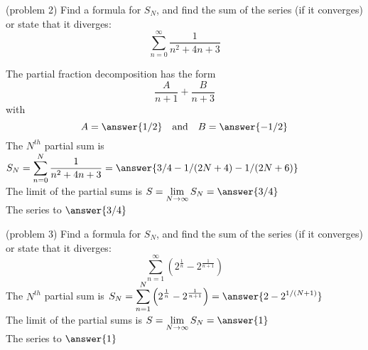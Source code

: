 \documentclass[handout]{ximera}
\begin{document}
\begin{problem}(problem 2)
Find a formula for $S_N$, and find the sum of the series (if it converges) or state that it diverges:
\[
\sum_{n=0}^\infty \frac{1}{n^2 + 4n + 3}    
\]

The partial fraction decomposition has the form
\[
\frac{A}{n+1} + \frac{B}{n+3}
\]
with 
\[
A = \answer{1/2} \quad \mbox{and} \quad B = \answer{-1/2}
\]
The $N^{th}$ partial sum is  $\displaystyle S_N = \sum_{n=0}^N \frac{1}{n^2 + 4n + 3} =  \answer{3/4 -  1/(2N+4)-  1/(2N+6)}$\\
The limit of the partial sums is $\displaystyle S = \lim_{N\to \infty}S_N = \answer{3/4}$\\
The series  to $\answer{3/4}$

\end{problem}


\begin{problem}(problem 3)
Find a formula for $S_N$, and find the sum of the series (if it converges) or state that it diverges:
\[
\sum_{n=1}^\infty \left( 2^{\frac{1}{n}} - 2^{\frac{1}{n+1}}\right) 
\]
The $N^{th}$ partial sum is  $\displaystyle S_N = \sum_{n=1}^N \left( 2^{\frac{1}{n}} - 2^{\frac{1}{n+1}}\right) =  \answer{2 - 2^{1/(N+1)}}$\\
The limit of the partial sums is $\displaystyle S = \lim_{N\to \infty}S_N = \answer{1}$\\
The series  to $\answer{1}$

\end{problem}
\end{document}
